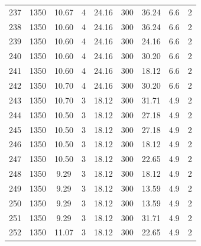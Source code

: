 \documentclass[11pt,twocolumn]{article}
\begin{document}
\begin{minipage}{\textwidth}
\begin{tabular}{ccccccccc}
237    &       1350 &     10.67 &             4 &     24.16 &       300 &       36.24 &                6.6 &           2 \\
238    &       1350 &     10.60 &             4 &     24.16 &       300 &       36.24 &                6.6 &           2 \\
239    &       1350 &     10.60 &             4 &     24.16 &       300 &       24.16 &                6.6 &           2 \\
240    &       1350 &     10.60 &             4 &     24.16 &       300 &       30.20 &                6.6 &           2 \\
241    &       1350 &     10.60 &             4 &     24.16 &       300 &       18.12 &                6.6 &           2 \\
242    &       1350 &     10.70 &             4 &     24.16 &       300 &       30.20 &                6.6 &           2 \\
243    &       1350 &     10.70 &             3 &     18.12 &       300 &       31.71 &                4.9 &           2 \\
244    &       1350 &     10.50 &             3 &     18.12 &       300 &       27.18 &                4.9 &           2 \\
245    &       1350 &     10.50 &             3 &     18.12 &       300 &       27.18 &                4.9 &           2 \\
246    &       1350 &     10.50 &             3 &     18.12 &       300 &       18.12 &                4.9 &           2 \\
247    &       1350 &     10.50 &             3 &     18.12 &       300 &       22.65 &                4.9 &           2 \\
248    &       1350 &       9.29 &             3 &     18.12 &       300 &       18.12 &                4.9 &           2 \\
249    &       1350 &       9.29 &             3 &     18.12 &       300 &       13.59 &                4.9 &           2 \\
250    &       1350 &       9.29 &             3 &     18.12 &       300 &       13.59 &                4.9 &           2 \\
251    &       1350 &       9.29 &             3 &     18.12 &       300 &       31.71 &                4.9 &           2 \\
252    &       1350 &     11.07 &             3 &     18.12 &       300 &       22.65 &                4.9 &           2 \\

\end{tabular}
\end{minipage}
\end{document}

